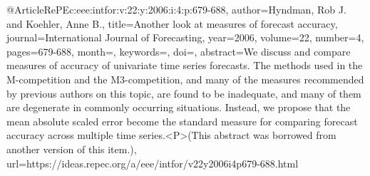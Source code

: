 




@Article{RePEc:eee:intfor:v:22:y:2006:i:4:p:679-688,
  author={Hyndman, Rob J. and Koehler, Anne B.},
  title={{Another look at measures of forecast accuracy}},
  journal={International Journal of Forecasting},
  year=2006,
  volume={22},
  number={4},
  pages={679-688},
  month={},
  keywords={},
  doi={},
  abstract={We discuss and compare measures of accuracy of univariate time series forecasts. The methods used in the M-competition and the M3-competition, and many of the measures recommended by previous authors on this topic, are found to be inadequate, and many of them are degenerate in commonly occurring situations. Instead, we propose that the mean absolute scaled error become the standard measure for comparing forecast accuracy across multiple time series.<P>(This abstract was borrowed from another version of this item.)},
  url={https://ideas.repec.org/a/eee/intfor/v22y2006i4p679-688.html}
}
